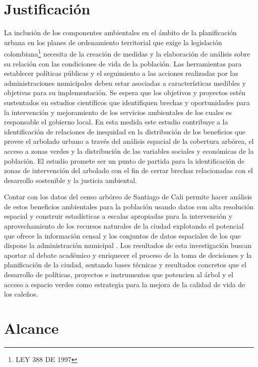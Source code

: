\documentclass[12pt,]{book}
\let\rmarkdownfootnote\footnote%
\def\footnote{\protect\rmarkdownfootnote}
\begin{document}
\section{Justificación}\label{justificacion}

La inclusión de los componentes ambientales en el ámbito de la
planificación urbana en los planes de ordenamiento territorial que exige
la legislación colombiana\footnote{LEY 388 DE 1997} necesita de la
creación de medidas y la elaboración de análisis sobre su relación con
las condiciones de vida de la población. Las herramientas para
establecer políticas públicas y el seguimiento a las acciones realizadas
por las administraciones municipales deben estar asociadas a
características medibles y objetivas para su implementación. Se espera
que los objetivos y proyectos estén sustentados en estudios científicos
que identifiquen brechas y oportunidades para la intervención y
mejoramiento de los servicios ambientales de los cuales es responsable
el gobierno local. En esta medida este estudio contribuye a la
identificación de relaciones de inequidad en la distribución de los
beneficios que provee el arbolado urbano a través del análisis espacial
de la cobertura arbórea, el acceso a zonas verdes y la distribución de
las variables sociales y económicas de la población. El estudio promete
ser un punto de partida para la identificación de zonas de intervención
del arbolado con el fin de cerrar brechas relacionadas con el desarrollo
sostenible y la justicia ambiental.

Contar con los datos del censo arbóreo de Santiago de Cali permite hacer
análisis de estos beneficios ambientales para la población usando datos
con alta resolución espacial y construir estadísticas a escalas
apropiadas para la intervención y aprovechamiento de los recursos
naturales de la ciudad explotando el potencial que ofrece la información
censal y los conjuntos de datos espaciales de los que dispone la
administración municipal \citep{schwarz_trees_2015}. Los resultados de
esta investigación buscan aportar al debate académico y enriquecer el
proceso de la toma de decisiones y la planificación de la ciudad,
sentando bases técnicas y resultados concretos que el desarrollo de
políticas, proyectos e instrumentos que potencien al árbol y el acceso a
espacio verdes como estrategia para la mejora de la calidad de vida de
los caleños.

\section{Alcance}\label{alcance}
\end{document}
